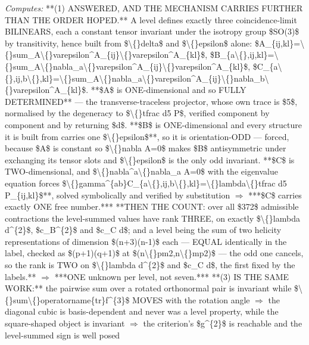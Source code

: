 \begin{description}
\emph{Computes:} **(1) ANSWERED, AND THE MECHANISM CARRIES FURTHER THAN THE ORDER HOPED.** A level defines exactly three coincidence-limit BILINEARS, each a constant tensor invariant under the isotropy group \$SO(3)\$ by transitivity, hence built from \$\textbackslash\{\}delta\$ and \$\textbackslash\{\}epsilon\$ alone: \$A\_\{ij,kl\}=\textbackslash\{\}sum\_A\textbackslash\{\}varepsilon\textasciicircum{}A\_\{ij\}\textbackslash\{\}varepsilon\textasciicircum{}A\_\{kl\}\$, \$B\_\{a\textbackslash\{\},ij,kl\}=\textbackslash\{\}sum\_A\textbackslash\{\}nabla\_a\textbackslash\{\}varepsilon\textasciicircum{}A\_\{ij\}\textbackslash\{\}varepsilon\textasciicircum{}A\_\{kl\}\$, \$C\_\{a\textbackslash\{\},ij,b\textbackslash\{\},kl\}=\textbackslash\{\}sum\_A\textbackslash\{\}nabla\_a\textbackslash\{\}varepsilon\textasciicircum{}A\_\{ij\}\textbackslash\{\}nabla\_b\textbackslash\{\}varepsilon\textasciicircum{}A\_\{kl\}\$. **\$A\$ is ONE-dimensional and so FULLY DETERMINED** --- the transverse-traceless projector, whose own trace is \$5\$, normalised by the degeneracy to \$\textbackslash\{\}tfrac d5 P\$, verified component by component and by returning \$d\$. **\$B\$ is ONE-dimensional and every structure it is built from carries one \$\textbackslash\{\}epsilon\$**, so it is orientation-ODD --- forced, because \$A\$ is constant so \$\textbackslash\{\}nabla A=0\$ makes \$B\$ antisymmetric under exchanging its tensor slots and \$\textbackslash\{\}epsilon\$ is the only odd invariant. **\$C\$ is TWO-dimensional, and \$\textbackslash\{\}nabla\textasciicircum{}a\textbackslash\{\}nabla\_a A=0\$ with the eigenvalue equation forces \$\textbackslash\{\}gamma\textasciicircum{}\{ab\}C\_\{a\textbackslash\{\},ij,b\textbackslash\{\},kl\}=\textbackslash\{\}lambda\textbackslash\{\}tfrac d5 P\_\{ij,kl\}\$**, solved symbolically and verified by substitution \ensuremath{\Rightarrow} ***\$C\$ carries exactly ONE free number.***  **THEN THE COUNT: over all \$372\$ admissible contractions the level-summed values have rank THREE, on exactly \$\textbackslash\{\}lambda d\textasciicircum{}\{2\}\$, \$c\_B\textasciicircum{}\{2\}\$ and \$c\_C d\$; and a level being the sum of two helicity representations of dimension \$(n+3)(n-1)\$ each --- EQUAL identically in the label, checked as \$(p+1)(q+1)\$ at \$(n\textbackslash\{\}pm2,n\textbackslash\{\}mp2)\$ --- the odd one cancels, so the rank is TWO on \$\textbackslash\{\}lambda d\textasciicircum{}\{2\}\$ and \$c\_C d\$, the first fixed by the labels.** \ensuremath{\Rightarrow} ***ONE unknown per level, not seven.*** **(3) IS THE SAME WORK:** the pairwise sum over a rotated orthonormal pair is invariant while \$\textbackslash\{\}sum\textbackslash\{\}operatorname\{tr\}f\textasciicircum{}\{3\}\$ MOVES with the rotation angle \ensuremath{\Rightarrow} the diagonal cubic is basis-dependent and never was a level property, while the square-shaped object is invariant \ensuremath{\Rightarrow} the criterion's \$g\textasciicircum{}\{2\}\$ is reachable and the level-summed sign is well posed

\end{description}
